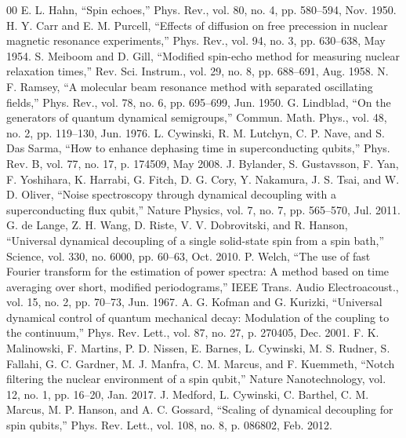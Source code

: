 \documentclass[10pt,twocolumn,a4paper]{article}
\begin{document}
\begin{thebibliography}{00}
 E. L. Hahn, ``Spin echoes,'' Phys. Rev., vol. 80, no. 4,
pp. 580--594, Nov. 1950.
 H. Y. Carr and E. M. Purcell, ``Effects of diffusion on free
precession in nuclear magnetic resonance experiments,'' Phys. Rev., vol. 94,
no. 3, pp. 630--638, May 1954.
 S. Meiboom and D. Gill, ``Modified spin-echo method for measuring
nuclear relaxation times,'' Rev. Sci. Instrum., vol. 29, no. 8, pp. 688--691,
Aug. 1958.
 N. F. Ramsey, ``A molecular beam resonance method with separated
oscillating fields,'' Phys. Rev., vol. 78, no. 6, pp. 695--699, Jun. 1950.
 G. Lindblad, ``On the generators of quantum dynamical semigroups,''
Commun. Math. Phys., vol. 48, no. 2, pp. 119--130, Jun. 1976.
 L. Cywinski, R. M. Lutchyn, C. P. Nave, and S. Das Sarma, ``How to
enhance dephasing time in superconducting qubits,'' Phys. Rev. B, vol. 77,
no. 17, p. 174509, May 2008.
 J. Bylander, S. Gustavsson, F. Yan, F. Yoshihara, K. Harrabi,
G. Fitch, D. G. Cory, Y. Nakamura, J. S. Tsai, and W. D. Oliver, ``Noise
spectroscopy through dynamical decoupling with a superconducting flux qubit,''
Nature Physics, vol. 7, no. 7, pp. 565--570, Jul. 2011.
 G. de Lange, Z. H. Wang, D. Riste, V. V. Dobrovitski, and
R. Hanson, ``Universal dynamical decoupling of a single solid-state spin from a
spin bath,'' Science, vol. 330, no. 6000, pp. 60--63, Oct. 2010.
 P. Welch, ``The use of fast Fourier transform for the estimation of
power spectra: A method based on time averaging over short, modified
periodograms,'' IEEE Trans. Audio Electroacoust., vol. 15, no. 2, pp. 70--73,
Jun. 1967.
 A. G. Kofman and G. Kurizki, ``Universal dynamical control of
quantum mechanical decay: Modulation of the coupling to the continuum,'' Phys.
Rev. Lett., vol. 87, no. 27, p. 270405, Dec. 2001.
 F. K. Malinowski, F. Martins, P. D. Nissen, E. Barnes,
L. Cywinski, M. S. Rudner, S. Fallahi, G. C. Gardner, M. J. Manfra,
C. M. Marcus, and F. Kuemmeth, ``Notch filtering the nuclear environment of a
spin qubit,'' Nature Nanotechnology, vol. 12, no. 1, pp. 16--20, Jan. 2017.
 J. Medford, L. Cywinski, C. Barthel, C. M. Marcus, M. P. Hanson,
and A. C. Gossard, ``Scaling of dynamical decoupling for spin qubits,'' Phys.
Rev. Lett., vol. 108, no. 8, p. 086802, Feb. 2012.
\end{thebibliography}
\end{document}
